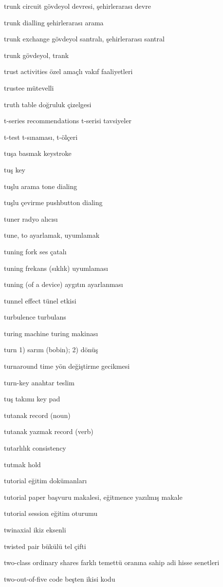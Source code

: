 \documentclass[12pt,fleqn]{article}\usepackage{../../common}
\begin{document}
trunk circuit gövdeyol devresi, şehirlerarası devre

trunk dialling şehirlerarası arama

trunk exchange gövdeyol santralı, şehirlerarası santral

trunk gövdeyol, trank

trust activities özel amaçlı vakıf faaliyetleri

trustee mütevelli

truth table doğruluk çizelgesi

t-series recommendations t-serisi tavsiyeler

t-test t-sınaması, t-ölçeri

tuşa basmak keystroke

tuş key

tuşlu arama tone dialing

tuşlu çevirme pushbutton dialing

tuner radyo alıcısı

tune, to ayarlamak, uyumlamak

tuning fork ses çatalı

tuning frekans (sıklık) uyumlaması

tuning (of a device) aygıtın ayarlanması

tunnel effect tünel etkisi

turbulence turbulans

turing machine turing makinası

turn 1) sarım (bobin); 2) dönüş

turnaround time yön değiştirme gecikmesi

turn-key anahtar teslim

tuş takımı key pad

tutanak record (noun)

tutanak yazmak record (verb)

tutarlılık consistency

tutmak hold

tutorial eğitim dokümanları

tutorial paper başvuru makalesi, eğitmence yazılmış makale

tutorial session eğitim oturumu

twinaxial ikiz eksenli

twisted pair bükülü tel çifti

two-class ordinary shares farklı temettü oranına sahip adi hisse senetleri

two-out-of-five code beşten ikisi kodu
\end{document}
